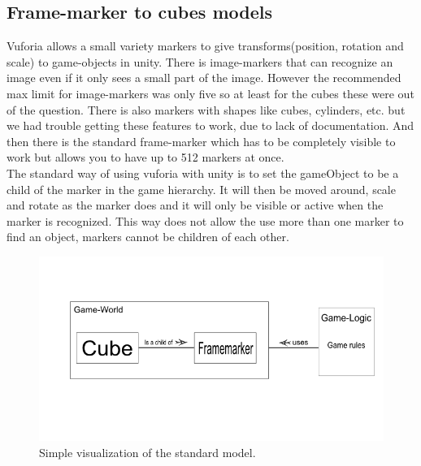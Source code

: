 \subsection{Frame-marker to cubes models}
\label{subsec:framemarker_model} 
Vuforia allows a small variety markers to give transforms(position, rotation and scale) to game-objects in unity. There is image-markers that can recognize an image even if it only sees a small part of the image. However the recommended max limit for image-markers was only five so at least for the cubes these were out of the question. There is also markers with shapes like cubes, cylinders, etc. but we had trouble getting these features to work, due to lack of documentation. And then there is the standard frame-marker which has to be completely visible to work but allows you to have up to 512 markers at once.\\
The standard way of using vuforia with unity is to set the gameObject to be a child of the marker in the game hierarchy. It will then be moved around, scale and rotate as the marker does and it will only be visible or active when the marker is recognized. This way does not allow the use more than one marker to find an object, markers cannot be children of each other. 

\begin{figure}[ht] 
        \capstart
        \centering  
        \includegraphics[width=\textwidth]{includes/simpleCubeMarkerModel.png}    
        \caption[Standard Cube-Marker model]{Simple visualization of the standard model.} 
        \label{fig:simple_cube_marker_model} 
\end{figure}

